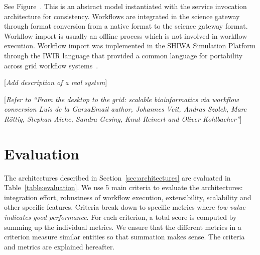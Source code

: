 \documentclass[preprint,3p,twocolumn]{elsarticle}
\newcommand{\todo}[1]{\color{blue}\xspace[\emph{#1}]\xspace\color{black}}
\begin{document}
See Figure~. This is an abstract model 
instantiated with the service invocation architecture for
consistency. Workflows are integrated in the science gateway through
format conversion from a native format to the science gateway
format. Workflow import is usually an offline process which is not
involved in workflow execution. Workflow import was implemented in the SHIWA
Simulation Platform through the IWIR language that provided a common
language for portability across grid workflow
systems~\cite{plankensteiner-prodan-etal:2013}.

\todo{Add description of a real system}

\todo{Refer to ``From the desktop to the grid: scalable bioinformatics via workflow conversion Luis de la GarzaEmail author, Johannes Veit, Andras Szolek, Marc Röttig, Stephan Aiche, Sandra Gesing, Knut Reinert and Oliver Kohlbacher''}

\section{Evaluation}

\label{sec:evaluation}

The architectures described in Section~\ref{sec:architectures} are
evaluated in Table~\ref{table:evaluation}. We use 5 main criteria to
evaluate the architectures: integration effort, robustness of workflow
execution, extensibility, scalability and other specific features. Criteria
break down to specific metrics where \emph{low value indicates good
  performance}. For each criterion, a total score is computed by
summing up the individual metrics. We ensure that the different
metrics in a criterion measure similar entities so that summation
makes sense. The
criteria and metrics are explained hereafter.
\end{document}
